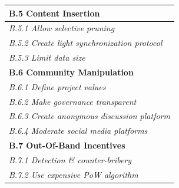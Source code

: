 \documentclass[12pt,a4paper]{article}
\begin{document}
\begin{tabular}{| l |}
  \textbf{B.5 Content Insertion}\\
  \hline
  \textit{B.5.1 Allow selective pruning}\\
  \hline
  \textit{B.5.2 Create light synchronization protocol}\\
  \hline
  \textit{B.5.3 Limit data size}\\
  \hline

  \textbf{B.6 Community Manipulation}\\
  \hline
  \textit{B.6.1 Define project values}\\
  \hline
  \textit{B.6.2 Make governance transparent}\\
  \hline
  \textit{B.6.3 Create anonymous discussion platform}\\
  \hline
  \textit{B.6.4 Moderate social media platforms}\\
  \hline

  \textbf{B.7 Out-Of-Band Incentives}\\
  \hline
  \textit{B.7.1 Detection \& counter-bribery}\\
  \hline
  \textit{B.7.2 Use expensive PoW algorithm}\\
  \hline

\end{tabular}
\end{document}
